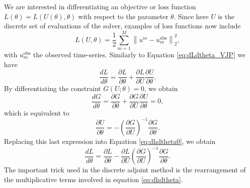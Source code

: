 We are interested in differentiating an objective or loss function $L(\theta) = L(U(\theta), \theta)$ with respect to the parameter $\theta$. 
Since here $U$ is the discrete set of evaluations of the solver, examples of loss functions now include 
\begin{equation}
    L(U, \theta) 
    = 
    \frac{1}{2} \sum_{m=1}^M \left \| u^m - u_m^\text{obs} \right \|_2^2, 
\end{equation}
with $u_m^\text{obs}$ the observed time-series. 
Similarly to Equation \eqref{eq:dLdtheta_VJP} we have 
\begin{equation}
    \frac{dL}{d\theta} 
    = 
    \frac{\partial L}{\partial \theta} 
    + 
    \frac{\partial L}{\partial U} \frac{\partial U}{\partial \theta}.
    \label{eq:dhdtheta0}
\end{equation}
By differentiating the constraint $G(U; \theta) = 0$, we obtain
\begin{equation}
    \frac{dG}{d\theta} 
    = 
    \frac{\partial G}{\partial \theta} 
    + 
    \frac{\partial G}{\partial U} \frac{\partial U}{\partial \theta}
    =
    0,
\end{equation}
which is equivalent to 
\begin{equation}
    \frac{\partial U}{\partial \theta} 
    = 
    - \left( \frac{\partial G}{\partial U} \right)^{-1} \frac{\partial G}{\partial \theta}.
    \label{eq:adjoint-inversion-implicit-theorem}
\end{equation}
Replacing this last expression into Equation \eqref{eq:dhdtheta0}, we obtain
\begin{equation}
    \frac{dL}{d\theta} 
    =
    \frac{\partial L}{\partial \theta} 
    - 
    \frac{\partial L}{\partial U}
    \left( \frac{\partial G}{\partial U} \right)^{-1} 
    \frac{\partial G}{\partial \theta}.
    \label{eq:dhdtheta}
\end{equation}
The important trick used in the discrete adjoint method is the rearrangement of the multiplicative terms involved in equation \eqref{eq:dhdtheta}. 
